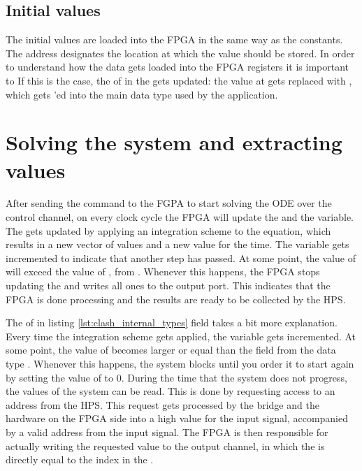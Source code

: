 \subsection{Initial values}
The initial values are loaded into the FPGA in the same way as the constants. The address designates the location at which the value should be stored. 
In order to understand how the data gets loaded into the FPGA registers it is important to  If this is the case, the  of  in the  gets updated: the value at  gets replaced with , which gets 'ed into the main data type used by the application. 





\section{Solving the system and extracting values}
\label{s:compute}
After sending the command to the FGPA to start solving the ODE over the control channel, on every clock cycle the FPGA will update the  and the  variable. The  gets updated by applying an integration scheme to the equation, which results in a new vector of values and a new value for the time. The  variable gets incremented to indicate that another step has passed. At some point, the value of  will exceed the value of , from . Whenever this happens, the FPGA stops updating the  and writes all ones to the output port. This indicates that the FPGA is done processing and the results are ready to be collected by the HPS. 

The  of  in listing \ref{lst:clash_internal_types} field takes a bit more explanation. Every time the integration scheme gets applied, the  variable gets incremented. At some point, the value of  becomes larger or equal than the  field from the data type . Whenever this happens, the system blocks until you order it to start again by setting the value of  to 0. During the time that the system does not progress, the values of the system can be read. This is done by requesting access to an address from the HPS. This request gets processed by the bridge and the hardware on the FPGA side into a high value for the  input signal, accompanied by a valid address from the  input signal. The FPGA is then responsible for actually writing the requested value to the output channel, in which the  is directly equal to the index in the .